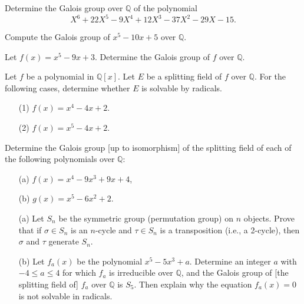 \begin{prob}[F2018-Q6]
    Determine the Galois group over \(\mathbb{Q}\) of the polynomial
    \[X^{6}+22X^{5}-9X^{4}+12X^{3}-37X^{2}-29X-15.\]
\end{prob}

\begin{prob}[F2017-Q4]
    Compute the Galois group of \(x^{5}-10x+5\) over \(\mathbb{Q}\).
\end{prob}


\begin{prob}[F2004-Q3]
    Let \(f(x) = x^5 - 9x + 3\). Determine the Galois group of \(f\) over \(\mathbb{Q}\).
\end{prob}

\begin{prob}[F2006-Q2]
    Let \(f\) be a polynomial in \(\mathbb{Q}[x]\). Let \(E\) be a splitting field of \(f\) over \(\mathbb{Q}\). For the following cases, determine whether \(E\) is solvable by radicals.
    \begin{itemize}
        \item[(1)] \(f(x) = x^4 - 4x + 2\).
        \item[(2)] \(f(x) = x^5 - 4x + 2\).
    \end{itemize}
\end{prob}

\begin{prob}[S2011-Q3]
    Determine the Galois group [up to isomorphism] of the splitting field of each of the following polynomials over \(\mathbb{Q}\):
    \begin{itemize}
        \item[(a)] \(f(x)=x^4-9x^3+9x+4\),
        \item[(b)] \(g(x)=x^5-6x^2+2\).
    \end{itemize}
\end{prob}

\begin{prob}[F2014-Q1]
    \phantom{text}
    \begin{itemize}
        \item[(a)] Let \(S_n\) be the symmetric group (permutation group) on \(n\) objects. Prove that if \(\sigma \in S_n\) is an \(n\)-cycle and \(\tau \in S_n\) is a transposition (i.e., a 2-cycle), then \(\sigma\) and \(\tau\) generate \(S_n\).
        \item[(b)] Let \(f_a(x)\) be the polynomial \(x^5 - 5x^3 + a\). Determine an integer \(a\) with \(-4 \leq a \leq 4\) for which \(f_a\) is irreducible over \(\mathbb{Q}\), and the Galois group of [the splitting field of] \(f_a\) over \(\mathbb{Q}\) is \(S_5\). Then explain why the equation \(f_a(x) = 0\) is not solvable in radicals.
    \end{itemize}
\end{prob}


